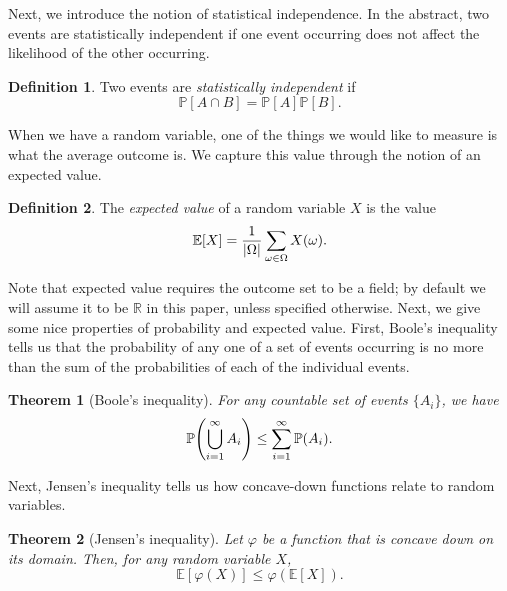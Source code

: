 \documentclass[english,12pt]{reedthesis}
\theoremstyle{plain}
\newtheorem{thm}{Theorem}[section]
\theoremstyle{definition}
\newtheorem{defn}[defn]{Definition}
\theoremstyle{remark}
\DeclarePairedDelimiter{\abs}{\lvert}{\rvert}
\begin{document}
Next, we introduce the notion of statistical independence. In the abstract, two
events are statistically independent if one event occurring does not affect the
likelihood of the other occurring.

\begin{defn}\label{def:stat-indep}
  Two events are \emph{statistically independent} if
  \[
    \mathbb{P}[A \cap B] = \mathbb{P}[A]\mathbb{P}[B].
  \]
\end{defn}

When we have a random variable, one of the things we would like to measure is
what the average outcome is. We capture this value through the notion of an
expected value.

\begin{defn}\label{def:expected-val}
  The \emph{expected value} of a random variable $X$ is the value
  \begin{equation*}
    \mathbb{E}[X] = \frac{1}{\abs{\Omega}}\sum_{\omega \in \Omega}X(\omega).
  \end{equation*}
\end{defn}

Note that expected value requires the outcome set to be a field; by default we
will assume it to be $\mathbb{R}$ in this paper, unless specified otherwise. Next, we
give some nice properties of probability and expected value. First, Boole's
inequality tells us that the probability of any one of a set of events occurring
is no more than the sum of the probabilities of each of the individual events.

\begin{thm}[{Boole's inequality}]\label{thm:boole-inequality}
  For any countable set of events $\{A_{i}\}$, we have
  \begin{equation}
    \mathbb{P}\mleft(\bigcup_{i=1}^{\infty}A_{i}\mright) \le \sum_{i=1}^{\infty}\mathbb{P}(A_{i}).
  \end{equation}
\end{thm}

Next, Jensen's inequality tells us how concave-down functions relate to random variables.

\begin{thm}[{Jensen's inequality}]\label{thm:jensen-inequality}
  Let $\varphi$ be a function that is concave down on its domain. Then, for any random
  variable $X$,
  \begin{equation}\label{eqn:jensen-inequality}
    \mathbb{E}[\varphi(X)] \le \varphi(\mathbb{E}[X]).
  \end{equation}
\end{thm}
\end{document}
